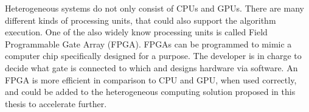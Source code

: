 Heterogeneous systems do not only consist of CPUs and GPUs. There are many different kinds of processing units, that could also support the algorithm execution. One of the also widely know processing units is called Field Programmable Gate Array (FPGA). FPGAs can be programmed to mimic a computer chip specifically designed for a purpose. The developer is in charge to decide what gate is connected to which and designs hardware via software. An FPGA is more efficient in comparison to CPU and GPU, when used correctly, \cite{qasaimehComparingEnergyEfficiency2019} and could be added to the heterogeneous computing solution proposed in this thesis to accelerate further.
% 